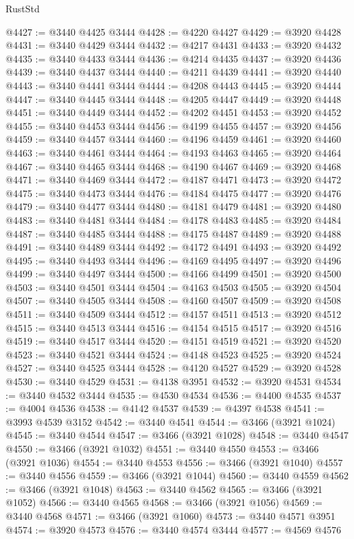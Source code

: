 \begin{lexlean}{RustStd}
\begin{coremodule}
@4427 := @3440 @4425 @3444
@4428 := @4220 @4427
@4429 := @3920 @4428
@4431 := @3440 @4429 @3444
@4432 := @4217 @4431
@4433 := @3920 @4432
@4435 := @3440 @4433 @3444
@4436 := @4214 @4435
@4437 := @3920 @4436
@4439 := @3440 @4437 @3444
@4440 := @4211 @4439
@4441 := @3920 @4440
@4443 := @3440 @4441 @3444
@4444 := @4208 @4443
@4445 := @3920 @4444
@4447 := @3440 @4445 @3444
@4448 := @4205 @4447
@4449 := @3920 @4448
@4451 := @3440 @4449 @3444
@4452 := @4202 @4451
@4453 := @3920 @4452
@4455 := @3440 @4453 @3444
@4456 := @4199 @4455
@4457 := @3920 @4456
@4459 := @3440 @4457 @3444
@4460 := @4196 @4459
@4461 := @3920 @4460
@4463 := @3440 @4461 @3444
@4464 := @4193 @4463
@4465 := @3920 @4464
@4467 := @3440 @4465 @3444
@4468 := @4190 @4467
@4469 := @3920 @4468
@4471 := @3440 @4469 @3444
@4472 := @4187 @4471
@4473 := @3920 @4472
@4475 := @3440 @4473 @3444
@4476 := @4184 @4475
@4477 := @3920 @4476
@4479 := @3440 @4477 @3444
@4480 := @4181 @4479
@4481 := @3920 @4480
@4483 := @3440 @4481 @3444
@4484 := @4178 @4483
@4485 := @3920 @4484
@4487 := @3440 @4485 @3444
@4488 := @4175 @4487
@4489 := @3920 @4488
@4491 := @3440 @4489 @3444
@4492 := @4172 @4491
@4493 := @3920 @4492
@4495 := @3440 @4493 @3444
@4496 := @4169 @4495
@4497 := @3920 @4496
@4499 := @3440 @4497 @3444
@4500 := @4166 @4499
@4501 := @3920 @4500
@4503 := @3440 @4501 @3444
@4504 := @4163 @4503
@4505 := @3920 @4504
@4507 := @3440 @4505 @3444
@4508 := @4160 @4507
@4509 := @3920 @4508
@4511 := @3440 @4509 @3444
@4512 := @4157 @4511
@4513 := @3920 @4512
@4515 := @3440 @4513 @3444
@4516 := @4154 @4515
@4517 := @3920 @4516
@4519 := @3440 @4517 @3444
@4520 := @4151 @4519
@4521 := @3920 @4520
@4523 := @3440 @4521 @3444
@4524 := @4148 @4523
@4525 := @3920 @4524
@4527 := @3440 @4525 @3444
@4528 := @4120 @4527
@4529 := @3920 @4528
@4530 := @3440 @4529
@4531 := @4138 @3951
@4532 := @3920 @4531
@4534 := @3440 @4532 @3444
@4535 := @4530 @4534
@4536 := @4400 @4535
@4537 := @4004 @4536
@4538 := @4142 @4537
@4539 := @4397 @4538
@4541 := @3993 @4539 @3152
@4542 := @3440 @4541
@4544 := @3466 (@3921 @1024)
@4545 := @3440 @4544
@4547 := @3466 (@3921 @1028)
@4548 := @3440 @4547
@4550 := @3466 (@3921 @1032)
@4551 := @3440 @4550
@4553 := @3466 (@3921 @1036)
@4554 := @3440 @4553
@4556 := @3466 (@3921 @1040)
@4557 := @3440 @4556
@4559 := @3466 (@3921 @1044)
@4560 := @3440 @4559
@4562 := @3466 (@3921 @1048)
@4563 := @3440 @4562
@4565 := @3466 (@3921 @1052)
@4566 := @3440 @4565
@4568 := @3466 (@3921 @1056)
@4569 := @3440 @4568
@4571 := @3466 (@3921 @1060)
@4573 := @3440 @4571 @3951
@4574 := @3920 @4573
@4576 := @3440 @4574 @3444
@4577 := @4569 @4576

\end{coremodule}
\end{lexlean}
